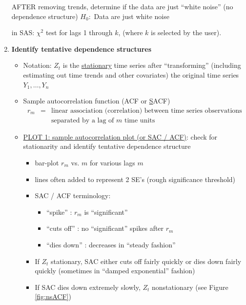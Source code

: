 \documentclass[12pt]{../notes}
\begin{document}
\begin{enumerate}[leftmargin=*]
AFTER removing trends, determine if the data are just ``white noise'' (no dependence structure)
$H_0:$ Data are just white noise

in SAS: $\chi^2$ test for lags 1 through $k$, (where $k$ is selected by the user). 



\item \textbf{Identify tentative dependence structures}
\begin{itemize}

 \item Notation: $Z_t$ is the \underline{stationary} time series after ``transforming''
  (including estimating out time trends and other covariates)
  the original time series $Y_1,\ldots,Y_n$\\

 \item Sample autocorrelation function (ACF or \underline{S}ACF)
    \begin{eqnarray}
      r_m & = & \mbox{linear association (correlation) between time series observations} \nonumber \\
         &   & \mbox{separated by a lag of $m$ time units} \nonumber
   \end{eqnarray}


\item \underline{PLOT 1: sample autocorrelation plot (or SAC / ACF)}: check for stationarity and identify tentative dependence structure
\begin{itemize}
  \item bar-plot $r_m$ vs. $m$ for various lags $m$
  \item lines often added to represent 2 SE's (rough significance threshold)
  \item SAC / ACF terminology:
    \begin{itemize}
      \item ``spike'' : $r_m$ is ``significant''
      \item ``cuts off'' : no ``significant'' spikes after $r_m$
      \item ``dies down'' : decreases in ``steady fashion''
    \end{itemize}



\item If $Z_t$ stationary, SAC either cuts off fairly quickly or dies down fairly quickly (sometimes in ``damped exponential'' fashion) \\ \vspace{1em}
\item If SAC dies down extremely slowly, $Z_t$ nonstationary (see Figure \ref{fig:nsACF}) \\ \vspace{1em}


\end{itemize}
\end{itemize}
\end{enumerate}
\end{document}
